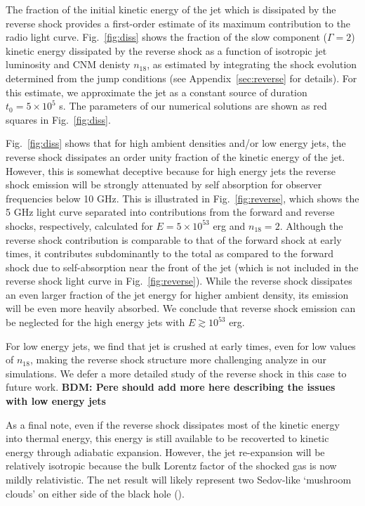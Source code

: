 \documentclass[usenatbib,fleqn]{mnras}
\begin{document}
The fraction of the initial kinetic energy of the jet which is
dissipated by the reverse shock provides a first-order estimate of its
maximum contribution to the radio light curve.  Fig.~\ref{fig:diss}
shows the fraction of the slow component ($\Gamma=2$) kinetic energy
dissipated by the reverse shock as a function of isotropic jet
luminosity and CNM denisty $n_{18}$, as estimated by integrating the
shock evolution determined from the jump conditions (see
Appendix~\ref{sec:reverse} for details).  For this estimate, we
approximate the jet as a constant source of duration $t_0 = 5 \times
10^{5}$ s.  The parameters of our numerical solutions are shown as red
squares in Fig.~\ref{fig:diss}.


Fig.~\ref{fig:diss} shows that for high ambient densities and/or low
energy jets, the reverse shock dissipates an order unity fraction of
the kinetic energy of the jet.  However, this is somewhat deceptive
because for high energy jets the reverse shock emission will be
strongly attenuated by self absorption for observer frequencies below
10 GHz.  This is illustrated in Fig.~\ref{fig:reverse}, which shows
the 5 GHz light curve separated into contributions from the forward
and reverse shocks, respectively, calculated for $E = 5\times 10^{53}$
erg and $n_{18} = 2$.  Although the reverse shock contribution is
comparable to that of the forward shock at early times, it contributes
subdominantly to the total as compared to the forward shock due to
self-absorption near the front of the jet (which is not included in
the reverse shock light curve in Fig.~\ref{fig:reverse}).  While the
reverse shock dissipates an even larger fraction of the jet energy for
higher ambient density, its emission will be even more heavily
absorbed.  We conclude that reverse shock emission can be neglected
for the high energy jets with $E\gtrsim 10^{53}$ erg.

For low energy jets, we find that jet is crushed at early times, even
for low values of $n_{18}$, making the reverse shock structure more
challenging analyze in our simulations.  We defer a more detailed
study of the reverse shock in this case to future work.  {\bf BDM:
  Pere should add more here describing the issues with low energy
  jets}

As a final note, even if the reverse shock dissipates most of the
kinetic energy into thermal energy, this energy is still available to
be recoverted to kinetic energy through adiabatic expansion.  However,
the jet re-expansion will be relatively isotropic because the bulk
Lorentz factor of the shocked gas is now mildly relativistic.  The net
result will likely represent two Sedov-like `mushroom clouds' on
either side of the black hole (\citealt{Giannios&Metzger2011}).
\end{document}
